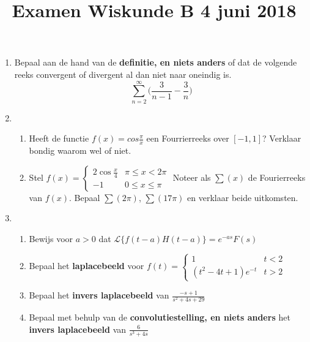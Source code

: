 \documentclass{article}
\begin{document}
\title{Examen Wiskunde B 4 juni 2018}

\date{}
\author{}
\maketitle

\begin{enumerate}

 \item  {
            Bepaal aan de hand van de \textbf{definitie, en niets anders} of dat de volgende reeks convergent of divergent al dan niet naar oneindig is. 
            $$\sum_{n = 2}^{\infty} \bigg(\frac{3}{n - 1} - \frac{3}{n}\bigg)$$
        }
        
 \item  {
            \begin{enumerate}
                \item Heeft de functie $f(x) = cos \frac{\pi}{x}$ een Fourrierreeks over $[-1, 1]$? Verklaar bondig waarom wel of niet.
                \item Stel $f(x) = \begin{cases}
                             2\cos \frac{x}{4}  & \pi \leq x < 2\pi \\
                             -1                 & 0 \leq x \leq \pi
                            \end{cases}$
                    Noteer als $\sum(x)$ de Fourierreeks van $f(x)$. Bepaal $\sum(2\pi)$, $\sum(17\pi)$ en verklaar beide uitkomsten.
            \end{enumerate}
        }
        
 \item \begin{enumerate}
        \item Bewijs voor $a > 0$ dat $\mathcal{L}\{f(t - a)H(t - a)\} = e^{-as}F(s)$
        \item Bepaal het \textbf{laplacebeeld} voor $f(t) =  \begin{cases}
                                                        1 & t < 2 \\
                                                        (t^2 - 4t + 1)e^{-t} & t > 2
                                                    \end{cases}$
        \item Bepaal het \textbf{invers laplacebeeld} van $\displaystyle\frac{-s + 1}{s^2 + 4s + 29}$ 
        \item Bepaal met behulp van de \textbf{convolutiestelling, en niets anders} het \textbf{invers laplacebeeld} van $\displaystyle \frac{6}{s^3 + 4s}$
       \end{enumerate}


\end{enumerate}
\end{document}
